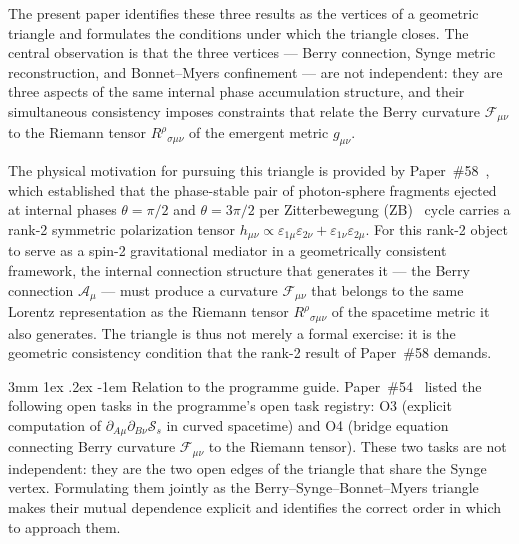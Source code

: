 \documentclass[%
 reprint, amsmath,amssymb, aps, prd, ]{revtex4-2}
\makeatletter
\numberwithin{equation}{section}
\renewcommand\paragraph{%
  \@startsection{paragraph}{4}{\z@}%
    {3mm \@plus 1ex \@minus .2ex}%
    {-1em}%
    {\normalfont\normalsize\itshape}}
\newcommand{\iphase}{\theta}
\newcommand{\BerryA}{\mathcal{A}}
\newcommand{\BerryF}{\mathcal{F}}
\newcommand{\SyngeS}{\mathcal{S}}
\makeatother
\begin{document}
The present paper identifies these three results as the vertices of a geometric triangle and formulates the conditions under which the triangle closes.
The central observation is that the three vertices --- Berry connection, Synge metric reconstruction, and Bonnet--Myers confinement --- are not independent: they are three aspects of the same internal phase accumulation structure, and their simultaneous consistency imposes constraints that relate the Berry curvature $\BerryF_{\mu\nu}$ to the Riemann tensor $R^\rho{}_{\sigma\mu\nu}$ of the emergent metric $g_{\mu\nu}$.

The physical motivation for pursuing this triangle is provided by Paper~\#58~\cite{hanamura58}, which established that the phase-stable pair of photon-sphere fragments ejected at internal phases $\iphase = \pi/2$ and $\iphase = 3\pi/2$ per Zitterbewegung (ZB)~\cite{Schrodinger1930} cycle carries a rank-2 symmetric polarization tensor $h_{\mu\nu} \propto \varepsilon_{1\mu}\varepsilon_{2\nu} + \varepsilon_{1\nu}\varepsilon_{2\mu}$.
For this rank-2 object to serve as a spin-2 gravitational mediator in a geometrically consistent framework, the internal connection structure that generates it --- the Berry connection $\BerryA_\mu$ --- must produce a curvature $\BerryF_{\mu\nu}$ that belongs to the same Lorentz representation as the Riemann tensor $R^\rho{}_{\sigma\mu\nu}$ of the spacetime metric it also generates.
The triangle is thus not merely a formal exercise: it is the geometric consistency condition that the rank-2 result of Paper~\#58 demands.

\paragraph{Relation to the programme guide.}
Paper~\#54~\cite{hanamura54} listed the following open tasks in the programme's open task registry: O3 (explicit computation of $\partial_{A\mu}\partial_{B\nu}\SyngeS_s$ in curved spacetime) and O4 (bridge equation connecting Berry curvature $\BerryF_{\mu\nu}$ to the Riemann tensor).
These two tasks are not independent: they are the two open edges of the triangle that share the Synge vertex.
Formulating them jointly as the Berry--Synge--Bonnet--Myers triangle makes their mutual dependence explicit and identifies the correct order in which to approach them.
\end{document}
